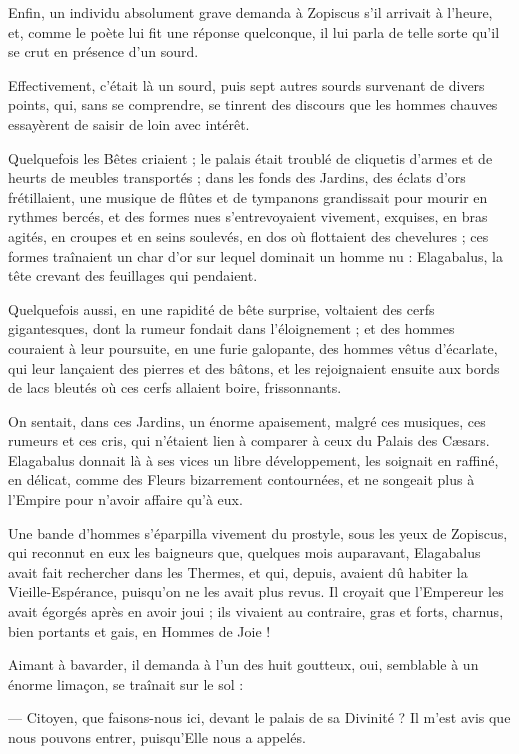 \documentclass[a4paper, 11pt, oneside, polutonikogreek, french]{article}
\begin{document}
Enfin, un individu absolument grave demanda à Zopiscus s'il arrivait à l'heure, et, comme le poète lui fit une réponse quelconque, il lui parla de telle sorte qu'il se crut en présence d'un sourd.

Effectivement, c'était là un sourd, puis sept autres sourds survenant de divers points, qui, sans se comprendre, se tinrent des discours que les hommes chauves essayèrent de saisir de loin avec intérêt.

Quelquefois les Bêtes criaient ; le palais était troublé de cliquetis d'armes et de heurts de meubles transportés ; dans les fonds des Jardins, des éclats d'ors frétillaient, une musique de flûtes et de tympanons grandissait pour mourir en rythmes bercés, et des formes nues s'entrevoyaient vivement, exquises, en bras agités, en croupes et en seins soulevés, en dos où flottaient des chevelures ; ces formes traînaient un char d'or sur lequel dominait un homme nu : Elagabalus, la tête crevant des feuillages qui pendaient.

Quelquefois aussi, en une rapidité de bête surprise, voltaient des cerfs gigantesques, dont la rumeur fondait dans l'éloignement ; et des hommes couraient à leur poursuite, en une furie galopante, des hommes vêtus d'écarlate, qui leur lançaient des pierres et des bâtons, et les rejoignaient ensuite aux bords de lacs bleutés où ces cerfs allaient boire, frissonnants.

On sentait, dans ces Jardins, un énorme apaisement, malgré ces musiques, ces rumeurs et ces cris, qui n'étaient lien à comparer à ceux du Palais des Cæsars. Elagabalus donnait là à ses vices un libre développement, les soignait en raffiné, en délicat, comme des Fleurs bizarrement contournées, et ne songeait plus à l'Empire pour n'avoir affaire qu'à eux.

Une bande d'hommes s'éparpilla vivement du prostyle, sous les yeux de Zopiscus, qui reconnut en eux les baigneurs que, quelques mois auparavant, Elagabalus avait fait rechercher dans les Thermes, et qui, depuis, avaient dû habiter la Vieille-Espérance, puisqu'on ne les avait plus revus. Il croyait que l'Empereur les avait égorgés après en avoir joui ; ils vivaient au contraire, gras et forts, charnus, bien portants et gais, en Hommes de Joie !

Aimant à bavarder, il demanda à l'un des huit goutteux, oui, semblable à un énorme limaçon, se traînait sur le sol :

--- Citoyen, que faisons-nous ici, devant le palais de sa Divinité ? Il m'est avis que nous pouvons entrer, puisqu'Elle nous a appelés.
\end{document}
